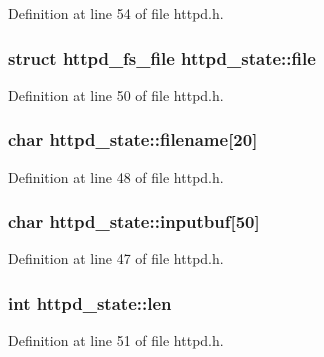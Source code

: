 Definition at line 54 of file httpd.h.

\hypertarget{structhttpd__state_a5e274a8f8b5fb2b3999c54fe27c76e46}{
\subsubsection[{file}]{\setlength{\rightskip}{0pt plus 5cm}struct {\bf httpd\_\-fs\_\-file} {\bf httpd\_\-state::file}}}
\label{structhttpd__state_a5e274a8f8b5fb2b3999c54fe27c76e46}


Definition at line 50 of file httpd.h.

\hypertarget{structhttpd__state_a447eb700ea7a185e0f155934995d49e5}{
\subsubsection[{filename}]{\setlength{\rightskip}{0pt plus 5cm}char {\bf httpd\_\-state::filename}\mbox{[}20\mbox{]}}}
\label{structhttpd__state_a447eb700ea7a185e0f155934995d49e5}


Definition at line 48 of file httpd.h.

\hypertarget{structhttpd__state_a4c6f843219271d25766ee5969e435d1a}{
\subsubsection[{inputbuf}]{\setlength{\rightskip}{0pt plus 5cm}char {\bf httpd\_\-state::inputbuf}\mbox{[}50\mbox{]}}}
\label{structhttpd__state_a4c6f843219271d25766ee5969e435d1a}


Definition at line 47 of file httpd.h.

\hypertarget{structhttpd__state_a468c04fff28e784f93ebc3f0849211dd}{
\subsubsection[{len}]{\setlength{\rightskip}{0pt plus 5cm}int {\bf httpd\_\-state::len}}}
\label{structhttpd__state_a468c04fff28e784f93ebc3f0849211dd}


Definition at line 51 of file httpd.h.

